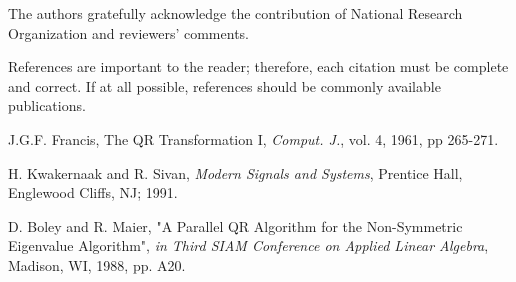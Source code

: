 \documentclass[letterpaper, 10 pt, conference]{ieeeconf}  %
\begin{document}
The authors gratefully acknowledge the contribution of National Research Organization and reviewers' comments.



References are important to the reader; therefore, each citation must be complete and correct. If at all possible, references should be commonly available publications.

\begin{thebibliography}{99}

J.G.F. Francis, The QR Transformation I, {\it Comput. J.}, vol. 4, 1961, pp 265-271.

H. Kwakernaak and R. Sivan, {\it Modern Signals and Systems}, Prentice Hall, Englewood Cliffs, NJ; 1991.

D. Boley and R. Maier, "A Parallel QR Algorithm for the Non-Symmetric Eigenvalue Algorithm", {\it in Third SIAM Conference on Applied Linear Algebra}, Madison, WI, 1988, pp. A20.

\end{thebibliography}
\end{document}
